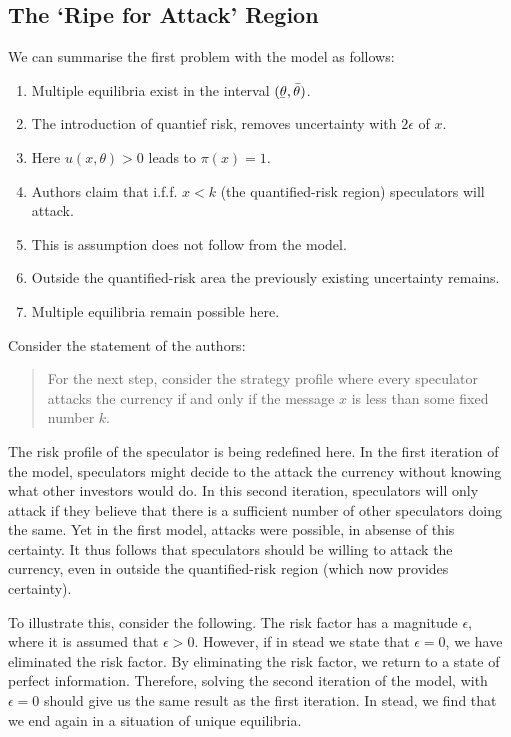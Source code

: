 \begin{refsection}
\subsection{The `Ripe for Attack' Region}
We can summarise the first problem with the model as follows:
\begin{enumerate}
	\item Multiple equilibria exist in the interval $(\underaccent{\bar}{\theta},\bar{\theta})$.
	\item The introduction of quantief risk, removes uncertainty with $2 \epsilon$ of $x$.
	\item Here $u(x,\theta) > 0$ leads to $\pi (x) = 1$.
	\item Authors claim that i.f.f. $x<k$ (the quantified-risk region) speculators will attack. 
	\item This is assumption does not follow from the model.
	\item Outside the quantified-risk area the previously existing uncertainty remains.
	\item Multiple equilibria remain possible here.
\end{enumerate}
Consider the statement of the authors:
\begin{quotation}
	For the next step,
	consider the strategy profile where every speculator attacks the currency if and only if
	the message $x$ is less than some fixed number $k$.
	\parencite[p.~592]{morris1998unique}
\end{quotation}
The risk profile of the speculator is being redefined here.
In the first iteration of the model,
speculators might decide to the attack the currency without knowing what other investors would do.
In this second iteration,
speculators will only attack if they believe that there is a sufficient number of other speculators doing the same.
Yet in the first model, attacks were possible, in absense of this certainty.
It thus follows that speculators should be willing to attack the currency,
even in outside the quantified-risk region (which now provides certainty).

To illustrate this, consider the following. The risk factor has a magnitude $\epsilon$,
where it is assumed that $\epsilon > 0$.
However, if in stead we state that $\epsilon = 0$, we have eliminated the risk factor.
By eliminating the risk factor, we return to a state of perfect information.
Therefore, solving the second iteration of the model, with $\epsilon = 0$ should give us the same result as the first iteration.
In stead, we find that we end again in a situation of unique equilibria.


\end{refsection}
